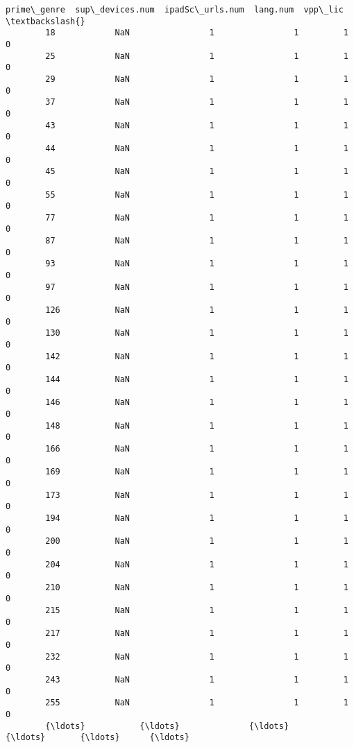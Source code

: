 \documentclass[11pt]{article}
\begin{document}
\begin{Verbatim}[commandchars=\\\{\}]
              prime\_genre  sup\_devices.num  ipadSc\_urls.num  lang.num  vpp\_lic  \textbackslash{}
        18            NaN                1                1         1        0   
        25            NaN                1                1         1        0   
        29            NaN                1                1         1        0   
        37            NaN                1                1         1        0   
        43            NaN                1                1         1        0   
        44            NaN                1                1         1        0   
        45            NaN                1                1         1        0   
        55            NaN                1                1         1        0   
        77            NaN                1                1         1        0   
        87            NaN                1                1         1        0   
        93            NaN                1                1         1        0   
        97            NaN                1                1         1        0   
        126           NaN                1                1         1        0   
        130           NaN                1                1         1        0   
        142           NaN                1                1         1        0   
        144           NaN                1                1         1        0   
        146           NaN                1                1         1        0   
        148           NaN                1                1         1        0   
        166           NaN                1                1         1        0   
        169           NaN                1                1         1        0   
        173           NaN                1                1         1        0   
        194           NaN                1                1         1        0   
        200           NaN                1                1         1        0   
        204           NaN                1                1         1        0   
        210           NaN                1                1         1        0   
        215           NaN                1                1         1        0   
        217           NaN                1                1         1        0   
        232           NaN                1                1         1        0   
        243           NaN                1                1         1        0   
        255           NaN                1                1         1        0   
        {\ldots}           {\ldots}              {\ldots}              {\ldots}       {\ldots}      {\ldots}   

\end{Verbatim}
\end{document}
